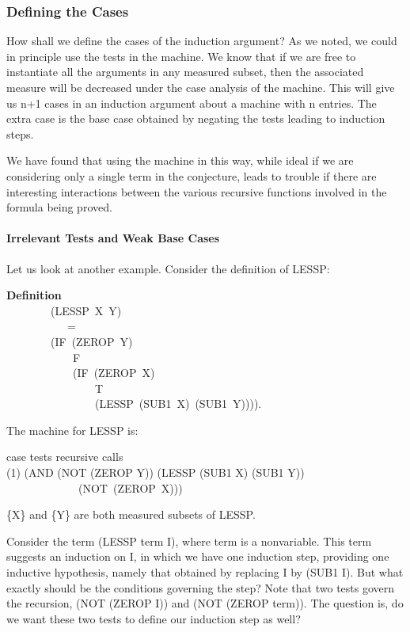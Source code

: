 \documentclass[10pt]{book}
\newenvironment{pubasis}{\begin{flushleft}}{\end{flushleft}}
\newcommand{\axiomordefinition}[1]{\vspace{6pt}\Large\textsf{\textbf{#1}}\normalsize}
\begin{document}
\subsubsection{Defining the Cases}
How shall we define the cases of the induction argument?  As we noted, we could
in principle use the tests in the machine.  We know that if we are free to
instantiate all the arguments in any measured subset, then the
associated measure will be decreased under the case analysis of the machine.
This will give us n+1 cases in an induction argument about a
machine with n entries.  The extra case is the base case obtained
by negating the tests leading to induction steps.

We have found that using the machine in this way, while ideal if we
are considering only a single term in the conjecture, leads to trouble if
there are interesting interactions between the various recursive functions
involved in the formula being proved.

\paragraph{Irrelevant Tests and Weak Base Cases}
Let us look at another example.  Consider the definition of LESSP:
\begin{pubasis}
\axiomordefinition{Definition}\\
~~~~~~~~(LESSP~X~Y)\\
~~~~~~~~~~~=\\
~~~~~~~~(IF~(ZEROP~Y)\\
~~~~~~~~~~~~F\\
~~~~~~~~~~~~(IF~(ZEROP~X)\\
~~~~~~~~~~~~~~~~T\\
~~~~~~~~~~~~~~~~(LESSP~(SUB1~X)~(SUB1~Y)))).\\
\end{pubasis}
The machine for LESSP is:
\begin{pubasis}
case	    tests		recursive calls\\

(1)	(AND (NOT (ZEROP Y))	(LESSP (SUB1 X) (SUB1 Y))\\
~~~~~~~~~~~~~(NOT~(ZEROP~X)))\\
\end{pubasis}
\{X\} and \{Y\} are both measured subsets of LESSP.

Consider the term (LESSP term I), where term is a nonvariable.
This term suggests an induction on I, in which we have one induction
step, providing one inductive hypothesis, namely that obtained
by replacing I by (SUB1 I).  But what exactly should be the conditions
governing the step?  Note that two tests govern the recursion,
(NOT (ZEROP I)) and (NOT (ZEROP term)).  The question is, do we
want these two tests to define our induction step as well?
\end{document}
